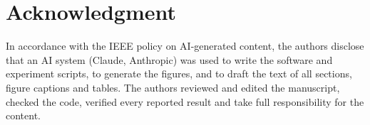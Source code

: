 \documentclass[journal]{IEEEtran}
\begin{document}
\section*{Acknowledgment}
In accordance with the IEEE policy on AI-generated content, the authors disclose that an AI system (Claude, Anthropic) was used to write the software and experiment scripts, to generate the figures, and to draft the text of all sections, figure captions and tables. The authors reviewed and edited the manuscript, checked the code, verified every reported result and take full responsibility for the content.



\end{document}
